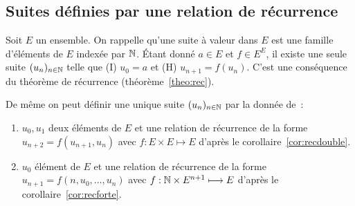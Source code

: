 \subsection{Suites définies par une relation de récurrence}

Soit \(E\) un ensemble. On rappelle qu'une suite à valeur dans \(E\) est une famille d'éléments de \(E\) indexée par \(\mathbb{N}\). Étant donné \(a\in E\) et \(f\in E^E\), il existe une seule suite \((u_n)_{n\in\mathbb{N}}\) telle que (I) \(u_0=a\) et (H) \(u_{n+1}=f(u_n)\). C'est une conséquence du théorème de récurrence (théorème~\ref{theo:rec}).

De même on peut définir une unique suite \((u_n)_{n\in\mathbb{N}}\) par la donnée de~:
\begin{enumerate}
\item \(u_0, u_1\) deux éléments de \(E\) et une relation de récurrence de la forme \(u_{n+2}=f(u_{n+1},u_{n})\) avec \(f:E\times E\longmapsto E\) d'après le corollaire~\ref{cor:recdouble}.
\item \(u_0\) élément de \(E\) et une relation de récurrence de la forme \(u_{n+1}=f(n,u_{0},\ldots,u_{n})\) avec \(f:\mathbb{N}\times E^{n+1}\longmapsto E\) d'après le corollaire~\ref{cor:recforte}.
\end{enumerate}

